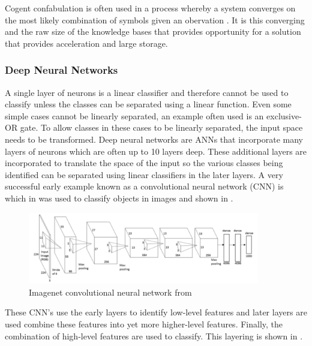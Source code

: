 Cogent confabulation is often used in a process whereby a system converges on the most likely combination of symbols given an obervation \cite{qiu2013parallel}.
It is this converging and the raw size of the knowledge bases that provides opportunity for a solution that provides acceleration and large storage.

\fi


\iftrue

\subsubsection*{Deep Neural Networks}

A single layer of neurons is a linear classifier and therefore cannot be used to classify unless the classes can be separated using a linear function.
Even some simple cases cannot be linearly separated, an example often used is an exclusive-OR gate.
To allow classes in these cases to be linearly separated, the input space needs to be transformed.
Deep neural networks are ANNs that incorporate many layers of neurons which are often up to 10 layers deep.
These additional layers are incorporated to translate the space of the input so the various classes being identified can be separated using linear classifiers in the later
layers.
A very successful early example known as a convolutional neural network (CNN) is which in \cite{krizhevsky2012imagenet} was used to classify objects in images
and shown in .
\begin{figure}[hbtp]
\centering
\includegraphics[width=0.9\textwidth]{Chapter-1/figs/deepNetworkShowingFeatureLayers}
\captionsetup{justification=centering, skip=-5pt}
\caption{Imagenet convolutional neural network from \cite{krizhevsky2012imagenetPreso}}
\label{fig:simple Imagenet network}
\end{figure}
These CNN's use the early layers to identify low-level features and later layers are used combine these features into yet more higher-level features.
Finally, the combination of high-level features are used to classify.
This layering is shown in .
